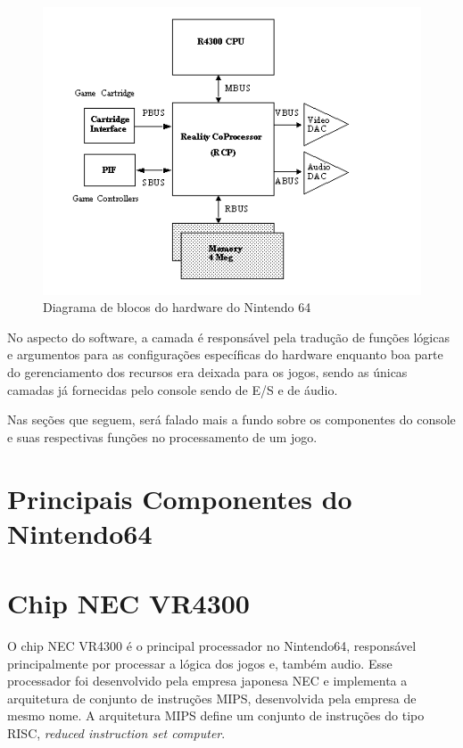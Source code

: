 \documentclass[12pt]{article}
\begin{document}
\begin{figure}[H]
    \label{fig:block-diagram}
    \centering
        \includegraphics[scale=.65]{figures/nintendo64-diagram}
    \caption{Diagrama de blocos do hardware do Nintendo 64}
\end{figure}

No aspecto do software, a camada é responsável pela tradução de
funções lógicas e argumentos para as configurações específicas
do hardware enquanto boa parte do gerenciamento dos recursos
era deixada para os jogos, sendo as únicas camadas já fornecidas
pelo console sendo de E/S e de áudio.

Nas seções que seguem, será falado mais a fundo sobre os componentes do
console e suas respectivas funções no processamento de um jogo.

\section{Principais Componentes do Nintendo64}



\section{Chip NEC VR4300}
    O chip NEC VR4300 é o principal processador no Nintendo64,
responsável principalmente por processar a lógica dos jogos e, 
também audio. Esse processador foi desenvolvido pela empresa japonesa
NEC e implementa a arquitetura de conjunto de instruções MIPS, 
desenvolvida pela empresa de mesmo nome. A arquitetura MIPS define um
conjunto de instruções do tipo RISC, \emph{reduced instruction set
computer}.
\end{document}
